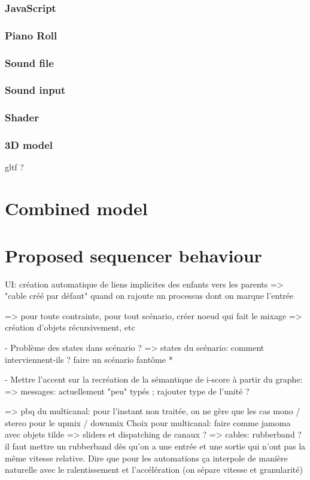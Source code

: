 \documentclass[a4paper]{article}
\begin{document}
\subsubsection{JavaScript}
\subsubsection{Piano Roll}
\subsubsection{Sound file}
\subsubsection{Sound input}

\subsubsection{Shader}
\subsubsection{3D model}
gltf ? 

\section{Combined model}
\subsection{}

\section{Proposed sequencer behaviour}
UI: création automatique de liens implicites des enfants vers les parents
=> "cable créé par défaut" quand on rajoute un processus dont on marque l'entrée

=> pour toute contrainte, pour tout scénario, créer noeud qui fait le mixage
=> création d'objets récursivement, etc

- Problème des states dans scénario ?
=> states du scénario: comment interviennent-ils ? faire un scénario fantôme *


- Mettre l'accent sur la recréation de la sémantique de i-score à partir du graphe: 
=> messages: actuellement "peu" typés ; rajouter type de l'unité ? 

=> pbq du multicanal: pour l'instant non traitée, on ne gère que les cas mono / stereo pour le upmix / downmix
Choix pour multicanal: faire comme jamoma avec objets tilde
=> sliders et dispatching de canaux ?
=> cables: rubberband ? il faut mettre un rubberband dès qu'on a une entrée et une sortie qui n'ont pas la même vitesse relative. Dire que pour les automations ça interpole de manière naturelle avec le ralentissement et l'accélération (on sépare vitesse et granularité)
\end{document}
